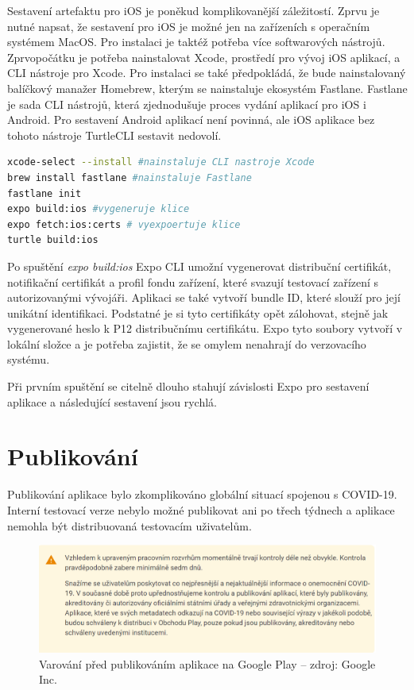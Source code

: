 Sestavení artefaktu pro iOS je poněkud komplikovanější záležitostí. Zprvu je nutné napsat, že sestavení pro iOS je možné jen na zařízeních s operačním systémem MacOS. Pro instalaci je taktéž potřeba více softwarových nástrojů. Zprvopočátku je potřeba nainstalovat Xcode, prostředí pro vývoj iOS aplikací, a CLI nástroje pro Xcode. Pro instalaci se také předpokládá, že bude nainstalovaný balíčkový manažer Homebrew, kterým se nainstaluje ekosystém Fastlane. Fastlane je sada CLI nástrojů, která zjednodušuje proces vydání aplikací pro iOS i Android. Pro sestavení Android aplikací není povinná, ale iOS aplikace bez tohoto nástroje TurtleCLI sestavit nedovolí.

\begin{lstlisting}[language=Bash, caption=Sestavení na iOS včetně vygenerování klíčů]
xcode-select --install #nainstaluje CLI nastroje Xcode 
brew install fastlane #nainstaluje Fastlane
fastlane init
expo build:ios #vygeneruje klice
expo fetch:ios:certs # vyexpoertuje klice 
turtle build:ios
\end{lstlisting}

Po spuštění \emph{expo build:ios} Expo CLI umožní vygenerovat distribuční certifikát, notifikační certifikát a profil fondu zařízení, které svazují testovací zařízení s autorizovanými vývojáři. Aplikaci se také vytvoří bundle ID, které slouží pro její unikátní identifikaci. Podstatné je si tyto certifikáty opět zálohovat, stejně jak vygenerované heslo k P12 distribučnímu certifikátu. Expo tyto soubory vytvoří v lokální složce a je potřeba zajistit, že se omylem nenahrají do verzovacího systému.

Při prvním spuštění se citelně dlouho stahují závislosti Expo pro sestavení aplikace a následující sestavení jsou rychlá.

\section{Publikování}

Publikování aplikace bylo zkomplikováno globální situací spojenou s COVID-19. Interní testovací verze nebylo možné publikovat ani po třech týdnech a aplikace nemohla být distribuovaná testovacím uživatelům.

\begin{figure}[H]
	\begin{center}
		\includegraphics[width=140mm]{img/covid19.png}
	\end{center}
	\caption[Varování před publikováním aplikace na Google Play]{Varování před publikováním aplikace na Google Play -- zdroj: Google Inc.}
\end{figure}

